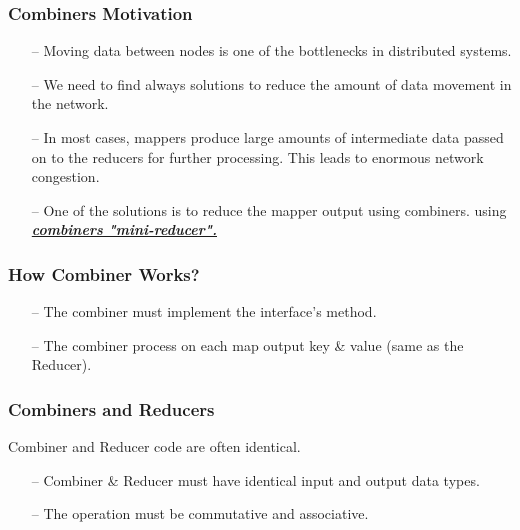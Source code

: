 \begin{frame}[c]{ }
	\frametitle{Combiners Motivation }
	
	
	\begin{itemize}  [<+->]
		\item [--] Moving data between nodes is one of the bottlenecks in distributed systems.
		\item [--] 	We need to find always solutions to reduce the amount of data movement in the network.
		\item [--] In most cases, mappers produce large amounts of intermediate data passed on to the reducers for further processing. This leads to enormous network congestion.
		\item [--] One of the solutions is to reduce the mapper output using combiners. using \textbf{\underline{\textit{combiners "mini-reducer".}}}
		
	\end{itemize}
\end{frame}
\begin{frame}[c]{ }
	\frametitle{How Combiner Works? }
	
	
	\begin{itemize}  [<+->]
		\item [--] The combiner must implement the  interface’s  method.
		
		\item [--] The combiner process on each map output key \& value (same as the Reducer). 

	\end{itemize}
\end{frame}

\begin{frame}[c]{ }
	\frametitle{Combiners and Reducers }
	
	Combiner and Reducer code are often identical. 
	\begin{itemize}  [<+->]
	
	\item [--] Combiner \& Reducer must have identical input and output data types.
	
	\item [--] The operation must be  commutative and associative.
	\end{itemize}
\end{frame}

